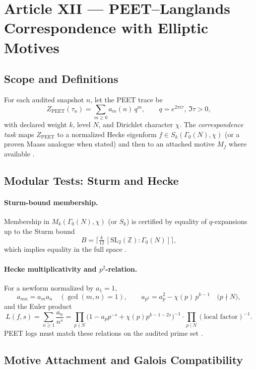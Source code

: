 \documentclass[12pt]{amsart}
\theoremstyle{plain}
\begin{document}
\section{Article XII — PEET–Langlands Correspondence with Elliptic Motives}

\subsection{Scope and Definitions}
For each audited snapshot $n$, let the PEET trace be
\[
Z_{\mathrm{PEET}}(\tau_n)=\sum_{m\ge 0} a_m(n)\,q^m,\qquad q=e^{2\pi i\tau},\ \Im\tau>0,
\]
with declared weight $k$, level $N$, and Dirichlet character $\chi$. The \emph{correspondence task} maps $Z_{\mathrm{PEET}}$ to a normalized Hecke eigenform $f\in S_k(\Gamma_0(N),\chi)$ (or a proven Maass analogue when stated) and then to an attached motive $M_f$ where available \cite{sturm1987congruence,diamond2005first,deligne1971formes}.

\subsection{Modular Tests: Sturm and Hecke}
\paragraph{Sturm-bound membership.}
Membership in $M_k(\Gamma_0(N),\chi)$ (or $S_k$) is certified by equality of $q$-expansions up to the Sturm bound
\[
B=\big\lceil\tfrac{k}{12}\,[\mathrm{SL}_2(\mathbb{Z}):\Gamma_0(N)]\big\rceil,
\]
which implies equality in the full space \cite{sturm1987congruence,diamond2005first}.

\paragraph{Hecke multiplicativity and $p^2$-relation.}
For a newform normalized by $a_1=1$,
\[
a_{mn}=a_m a_n\quad(\gcd(m,n)=1),\qquad
a_{p^2}=a_p^2-\chi(p)\,p^{k-1}\quad\big(p\nmid N\big),
\]
and the Euler product
\[
L(f,s)=\sum_{n\ge1}\frac{a_n}{n^{s}}
=\prod_{p\nmid N}\Big(1-a_p p^{-s}+\chi(p)p^{k-1-2s}\Big)^{-1}\cdot\prod_{p\mid N}(\text{local factor})^{-1}.
\]
PEET logs must match these relations on the audited prime set \cite{diamond2005first}.

\subsection{Motive Attachment and Galois Compatibility}
\end{document}
